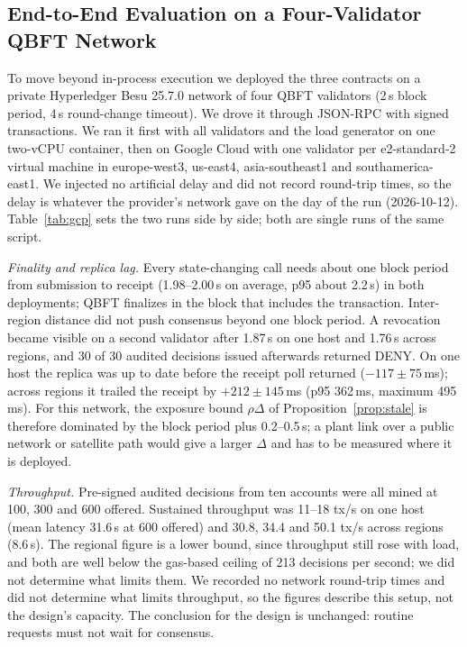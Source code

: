 \begin{table}[t]
\centering
\caption{Governance: mean testbed latency (ms) cooperative and under maximal dissent; \% trials where maximal dissent still reached quorum (Appr.); \% where a $q-1$ coalition executed a revocation (Forced); EVM gas for one quorum revocation}
\label{tab:governance}
\scriptsize

\end{table}

\subsection{End-to-End Evaluation on a Four-Validator QBFT Network}\label{sec:besu_eval}
To move beyond in-process execution we deployed the three contracts on a private Hyperledger Besu 25.7.0 network of four QBFT validators (2\,s block period, 4\,s round-change timeout). We drove it through JSON-RPC with signed transactions. We ran it first with all validators and the load generator on one two-vCPU container, then \label{sec:gcp_eval}on Google Cloud with one validator per e2-standard-2 virtual machine in europe-west3, us-east4, asia-southeast1 and southamerica-east1. We injected no artificial delay and did not record round-trip times, so the delay is whatever the provider's network gave on the day of the run (2026-10-12). Table~\ref{tab:gcp} sets the two runs side by side; both are single runs of the same script.

\emph{Finality and replica lag.} Every state-changing call needs about one block period from submission to receipt (1.98--2.00\,s on average, p95 about 2.2\,s) in both deployments; QBFT finalizes in the block that includes the transaction. Inter-region distance did not push consensus beyond one block period. A revocation became visible on a second validator after 1.87\,s on one host and 1.76\,s across regions, and 30 of 30 audited decisions issued afterwards returned DENY. On one host the replica was up to date before the receipt poll returned ($-117\pm75$\,ms); across regions it trailed the receipt by $+212\pm145$\,ms (p95 362\,ms, maximum 495\,ms). For this network, the exposure bound $\rho\Delta$ of Proposition~\ref{prop:stale} is therefore dominated by the block period plus 0.2--0.5\,s; a plant link over a public network or satellite path would give a larger $\Delta$ and has to be measured where it is deployed.

\emph{Throughput.} Pre-signed audited decisions from ten accounts were all mined at 100, 300 and 600 offered. Sustained throughput was 11--18 tx/s on one host (mean latency 31.6\,s at 600 offered) and 30.8, 34.4 and 50.1 tx/s across regions (8.6\,s). The regional figure is a lower bound, since throughput still rose with load, and both are well below the gas-based ceiling of 213 decisions per second; we did not determine what limits them. We recorded no network round-trip times and did not determine what limits throughput, so the figures describe this setup, not the design's capacity. The conclusion for the design is unchanged: routine requests must not wait for consensus.

